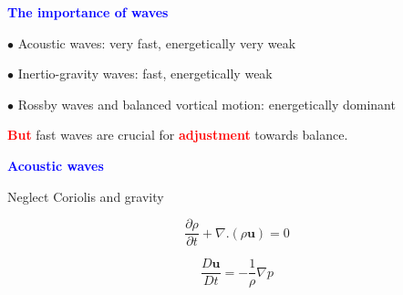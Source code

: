 \documentclass[a4]{seminar}
\newcommand{\R}[1]{\textcolor{red}{#1}}
\newcommand{\B}[1]{\textcolor{blue}{#1}}
\begin{document}
\begin{slide}

\begin{center}
\end{center}


\end{slide}


\begin{slide}

\B{\bf The importance of waves}

\vspace{6mm}

\( \bullet \) Acoustic waves: very fast, energetically very weak

\vspace{2mm}

\( \bullet \) Inertio-gravity waves: fast, energetically weak

\vspace{2mm}

\( \bullet \) Rossby waves and balanced vortical motion: energetically dominant

\vspace{5mm}

\R{\bf But} fast waves are crucial for \R{\bf adjustment} towards balance.


\end{slide}


\begin{slide}

\B{\bf Acoustic waves}

\vspace{5mm}

Neglect Coriolis and gravity

\begin{displaymath}
\frac{\partial \rho}{\partial t}  + \nabla . (\rho \mathbf{u})= 0
\end{displaymath}

\begin{displaymath}
\frac{D \mathbf{u}}{D t}
=
- \frac{1}{\rho} \nabla p 
\end{displaymath}


\end{slide}

\end{document}
